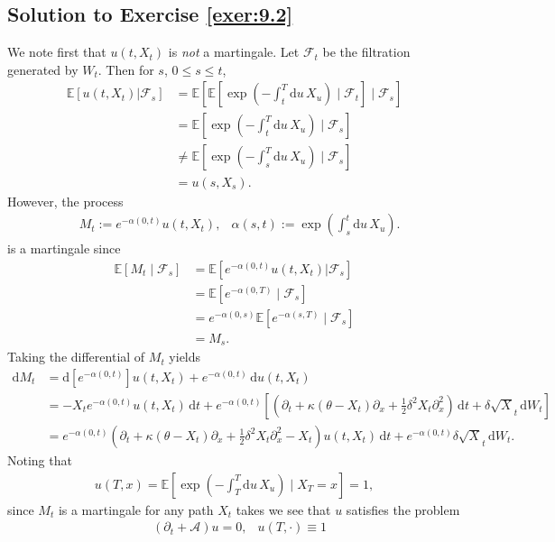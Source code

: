 \documentclass[12pt]{book}
\numberwithin{equation}{chapter}
\theoremstyle{plain}
\numberwithin{theorem}{section}
\theoremstyle{definition}
\numberwithin{exercise}{chapter}
\newcommand{\<}{\langle}
\renewcommand{\>}{\rangle}
\renewcommand{\(}{\left(}
\renewcommand{\)}{\right)}
\renewcommand{\[}{\left[}
\renewcommand{\]}{\right]}
\newcommand\Eb{\mathds{E}}
\newcommand\Ac{\mathscr{A}}
\newcommand\Fc{\mathscr{F}}
\renewcommand\d{\partial}
\newcommand\dd{\mathrm{d}}
\newcommand\half{\frac{1}{2}}
\begin{document}
\subsection*{Solution to Exercise \ref{exer:9.2}}
We note first that $u(t,X_t)$ is \textit{not} a martingale. Let $\Fc_t$ be the filtration generated by $W_t$. Then for $s$, $0 \leq s \leq t$,
\begin{align}
\Eb[ u(t,X_t) | \Fc_s]
	&= \Eb\[ 
		\Eb \[ 
			\exp \(- \int_t^T \dd u\, X_u\) \mid \Fc_t
		\] \mid \Fc_s
	      \] \\
	&= \Eb\[ 
			\exp \(- \int_t^T \dd u\, X_u\)  \mid \Fc_s
	      \] \\
	&\neq \Eb\[ 
			\exp \(- \int_s^T \dd u\, X_u\)  \mid \Fc_s
	      \] \\
	&= u(s,X_s).
\end{align}
However, the process
\begin{align}
&M_t
	:= e^{-\alpha(0,t)} u(t,X_t),
& \alpha(s,t) := \exp\( \int_s^t \dd u\, X_u\).
\end{align}
is a martingale since
\begin{align}
\Eb[M_t \mid \Fc_s]
	&= \Eb\[e^{-\alpha(0,t)} u(t,X_t) | \Fc_s\]\\
	&= \Eb\[ 
		e^{-\alpha(0,T)} \mid \Fc_s
	      \] \\
	&= e^{-\alpha(0,s)} \Eb\[ e^{-\alpha(s,T)}\mid \Fc_s \] \\ 
	&= M_s.
\end{align}
Taking the differential of $M_t$ yields
\begin{align}
\dd M_t	
	&= \dd \[ e^{-\alpha(0,t)} \] u(t,X_t)
		+ e^{-\alpha(0,t)}\, \dd u(t,X_t) \\
	&= -X_t e^{-\alpha(0,t)} u(t,X_t)\, \dd t
		+ e^{-\alpha(0,t)} 
		\[
\( \d_t + \kappa ( \theta- X_t) \d_x + \half\delta^2 X_t \d_x^2\)\, \dd t + \delta \sqrt X_t\, \dd W_t
		\] \\
	&= e^{-\alpha(0,t)}  \( \d_t + \kappa ( \theta- X_t) \d_x + \half \delta^2 X_t \d_x^2 - X_t\) 
		u(t,X_t)\, \dd t 
	  + e^{-\alpha(0,t)}\delta \sqrt X_t\, \dd W_t.
\end{align}
Noting that
\begin{align}
u(T,x)
	= \Eb\[ \exp\( - \int_T^T \dd u\, X_u\) \mid X_T = x\]
	= 1,
\end{align}
since $M_t$ is a martingale for any path $X_t$ takes we see that $u$ satisfies the problem
\begin{align}
&(\d_t + \Ac) u
	= 0,
&u(T,\cdot) 
	\equiv 1 \label{prob1}
\end{align}
\end{document}
